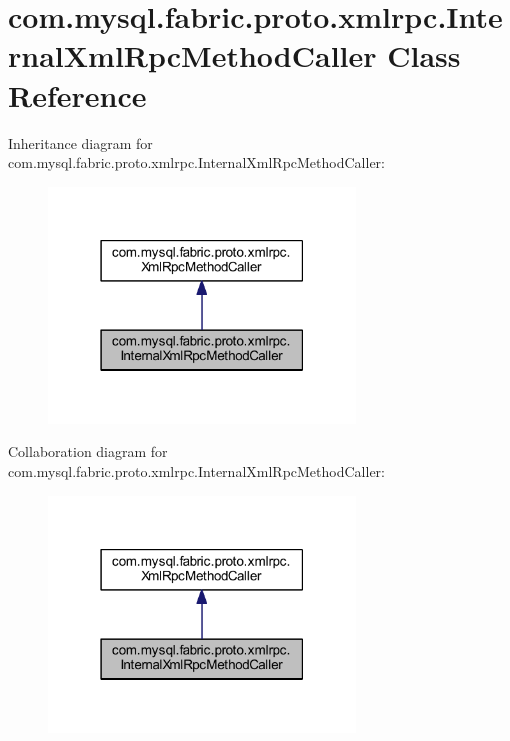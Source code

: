 \hypertarget{classcom_1_1mysql_1_1fabric_1_1proto_1_1xmlrpc_1_1_internal_xml_rpc_method_caller}{}\section{com.\+mysql.\+fabric.\+proto.\+xmlrpc.\+Internal\+Xml\+Rpc\+Method\+Caller Class Reference}
\label{classcom_1_1mysql_1_1fabric_1_1proto_1_1xmlrpc_1_1_internal_xml_rpc_method_caller}


Inheritance diagram for com.\+mysql.\+fabric.\+proto.\+xmlrpc.\+Internal\+Xml\+Rpc\+Method\+Caller\+:\nopagebreak
\begin{figure}[H]
\begin{center}
\leavevmode
\includegraphics[width=231pt]{classcom_1_1mysql_1_1fabric_1_1proto_1_1xmlrpc_1_1_internal_xml_rpc_method_caller__inherit__graph}
\end{center}
\end{figure}


Collaboration diagram for com.\+mysql.\+fabric.\+proto.\+xmlrpc.\+Internal\+Xml\+Rpc\+Method\+Caller\+:\nopagebreak
\begin{figure}[H]
\begin{center}
\leavevmode
\includegraphics[width=231pt]{classcom_1_1mysql_1_1fabric_1_1proto_1_1xmlrpc_1_1_internal_xml_rpc_method_caller__coll__graph}
\end{center}
\end{figure}
